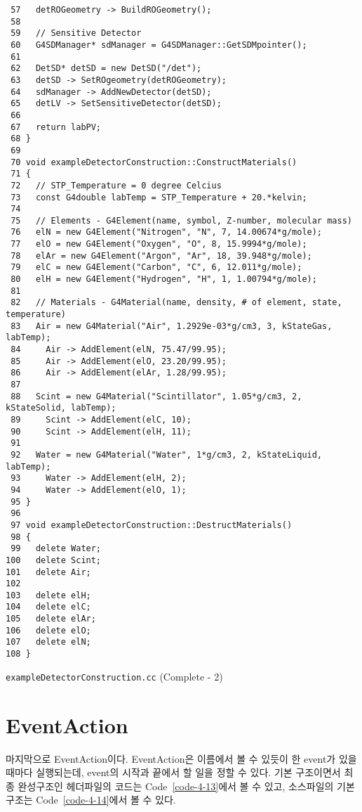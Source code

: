 \begin{code}[p]
\begin{lstlisting}
 57   detROGeometry -> BuildROGeometry();
 58 
 59   // Sensitive Detector
 60   G4SDManager* sdManager = G4SDManager::GetSDMpointer();
 61 
 62   DetSD* detSD = new DetSD("/det");
 63   detSD -> SetROgeometry(detROGeometry);
 64   sdManager -> AddNewDetector(detSD);
 65   detLV -> SetSensitiveDetector(detSD);
 66 
 67   return labPV;
 68 }
 69 
 70 void exampleDetectorConstruction::ConstructMaterials()
 71 {
 72   // STP_Temperature = 0 degree Celcius
 73   const G4double labTemp = STP_Temperature + 20.*kelvin;
 74 
 75   // Elements - G4Element(name, symbol, Z-number, molecular mass)
 76   elN = new G4Element("Nitrogen", "N", 7, 14.00674*g/mole);
 77   elO = new G4Element("Oxygen", "O", 8, 15.9994*g/mole);
 78   elAr = new G4Element("Argon", "Ar", 18, 39.948*g/mole);
 79   elC = new G4Element("Carbon", "C", 6, 12.011*g/mole);
 80   elH = new G4Element("Hydrogen", "H", 1, 1.00794*g/mole);
 81 
 82   // Materials - G4Material(name, density, # of element, state, temperature)
 83   Air = new G4Material("Air", 1.2929e-03*g/cm3, 3, kStateGas, labTemp);
 84     Air -> AddElement(elN, 75.47/99.95);
 85     Air -> AddElement(elO, 23.20/99.95);
 86     Air -> AddElement(elAr, 1.28/99.95);
 87 
 88   Scint = new G4Material("Scintillator", 1.05*g/cm3, 2, kStateSolid, labTemp);
 89     Scint -> AddElement(elC, 10);
 90     Scint -> AddElement(elH, 11);
 91 
 92   Water = new G4Material("Water", 1*g/cm3, 2, kStateLiquid, labTemp);
 93     Water -> AddElement(elH, 2);
 94     Water -> AddElement(elO, 1);
 95 }
 96 
 97 void exampleDetectorConstruction::DestructMaterials()
 98 {
 99   delete Water;
100   delete Scint;
101   delete Air;
102 
103   delete elH;
104   delete elC;
105   delete elAr;
106   delete elO;
107   delete elN;
108 }
\end{lstlisting}
\caption{\texttt{exampleDetectorConstruction.cc} (Complete - 2) \label{code-4-12}}
\end{code}

\section{EventAction}

마지막으로 EventAction이다. EventAction은 이름에서 볼 수 있듯이 한 event가 있을
때마다 실행되는데, event의 시작과 끝에서 할 일을 정할 수 있다. 기본 구조이면서
최종 완성구조인 헤더파일의 코드는 Code~\ref{code-4-13}에서 볼 수 있고,
소스파일의 기본구조는 Code~\ref{code-4-14}에서 볼 수 있다.

